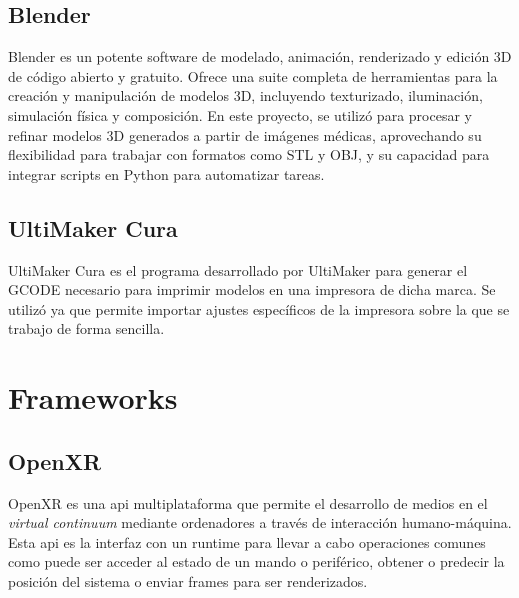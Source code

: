     \subsection{Blender}
Blender es un potente software de modelado, animación, renderizado y edición 3D de código abierto y gratuito. Ofrece una suite completa de herramientas para la creación y manipulación de modelos 3D, incluyendo texturizado, iluminación, simulación física y composición. En este proyecto, se utilizó para procesar y refinar modelos 3D generados a partir de imágenes médicas, aprovechando su flexibilidad para trabajar con formatos como STL y OBJ, y su capacidad para integrar scripts en Python para automatizar tareas.
    \subsection{UltiMaker Cura}
UltiMaker Cura es el programa desarrollado por UltiMaker para generar el GCODE necesario para imprimir modelos en una impresora de dicha marca. Se utilizó ya que permite importar ajustes específicos de la impresora sobre la que se trabajo de forma sencilla.
\section{Frameworks}
\subsection{OpenXR}
OpenXR es una \acrfull{api} multiplataforma que permite el desarrollo de medios en el \textit{virtual continuum} mediante ordenadores a través de interacción humano-máquina.
Esta \acrshort{api} es la interfaz con un runtime para llevar a cabo operaciones comunes como puede ser acceder al estado de un mando o periférico, obtener o predecir la posición del sistema o enviar frames para ser renderizados.


